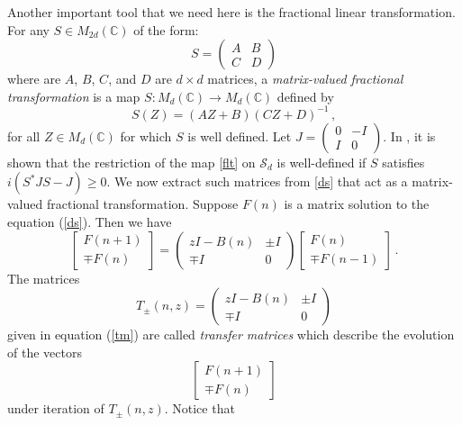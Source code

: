 \documentclass[reqno]{amsart}
\numberwithin{equation}{section}
\newcommand{\C}{\mathbb{C}}
\begin{document}
Another important tool that we need here is the fractional linear transformation.  For any $S\in M_{2d }(\C)$ of the form:
\begin{equation*}
	S= \begin{pmatrix} A & B \\ C & D \end{pmatrix}
\end{equation*}
where are $A$, $B$, $C$, and $D$ are $d\times d$ matrices, a {\it matrix-valued fractional   transformation} is a map $S: M_{d }(\C) \rightarrow  M_{d }(\C)$ defined by
\begin{equation}\label{flt}
	S(Z) = (AZ + B) (CZ +D)^{-1}\,,
\end{equation}
for all $Z \in M_{d }(\C) $ for which $S$ is well defined. Let $ J= \begin{pmatrix}0 & -I \\ I & 0 \end{pmatrix}.$  In \cite{KM}, it is shown that the  restriction of the map \eqref{flt} on $\mathcal S_d$ is well-defined if $S$ satisfies $i(S^*JS-J) \geq 0 .$  We now extract such matrices from \eqref{ds} that act as a matrix-valued fractional transformation.
Suppose $F(n)$ is a matrix solution to the equation (\ref{ds}). Then we have 
\begin{equation}\label{tm}
	\begin{bmatrix} F(n+1) \\ \mp F(n) \end{bmatrix} = \begin{pmatrix} z I -B(n) & \pm I \\ \mp I  & 0 \end{pmatrix} \begin{bmatrix} F(n) \\ \mp F(n-1) \end{bmatrix}\,
.\end{equation}
   The matrices 
\begin{equation}\label{tm1} 
	T_{\pm}(n,z) = \begin{pmatrix} z I -B(n) & \pm I \\ \mp I  & 0 \end{pmatrix}
\end{equation}
given in equation (\ref{tm}) are called {\it transfer matrices} which describe the evolution of the vectors
\begin{equation*}
	\begin{bmatrix} F(n+1) \\ \mp F(n) \end{bmatrix}
\end{equation*}
under iteration of $T_{\pm}(n,z)$. Notice that  
     
\end{document}
